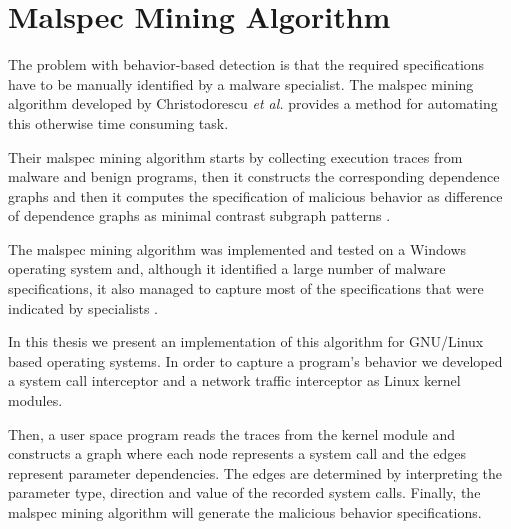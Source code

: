 \section{Malspec Mining Algorithm}
\label{sec:malspec-alg}

The problem with behavior-based detection is that the required specifications have to be manually identified by a malware specialist. The malspec mining algorithm developed by Christodorescu \textit{et al.} \cite{mining-specifications} provides a method for automating this otherwise time consuming task. 

Their malspec mining algorithm starts by collecting execution traces from malware and benign programs, then it constructs the corresponding dependence graphs and then it computes the specification of malicious behavior as difference of dependence graphs as minimal contrast subgraph patterns \cite{minimal-contrast-subgraph}.

The malspec mining algorithm was implemented and tested on a Windows operating system and, although it identified a large number of malware specifications, it also managed to capture most of the specifications that were indicated by specialists \cite{mining-specifications}.

In this thesis we present an implementation of this algorithm for GNU/Linux based operating systems. In order to capture a program’s behavior we developed a system call interceptor and a network traffic interceptor as Linux kernel modules.

Then, a user space program reads the traces from the kernel module and constructs a graph where each node represents a system call and the edges represent parameter dependencies. The edges are determined by interpreting the parameter type, direction and value of the recorded system calls. Finally, the malspec mining algorithm will generate the malicious behavior specifications.

